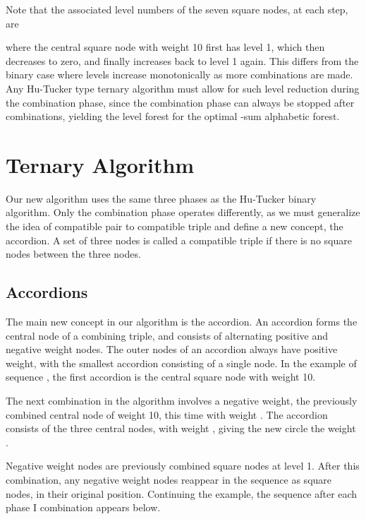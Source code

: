\documentclass[12pt]{article}
\begin{document}
Note that the associated level numbers of the seven square nodes, at each step,
are





\noindent where the central square node with weight 10 first has level 1, which then
decreases to zero, and finally increases back to level 1 again. This differs from the
binary case where levels increase monotonically as more combinations are made.
Any Hu-Tucker type ternary algorithm must allow for such level reduction during the
combination phase, since the combination phase can always be stopped after 
combinations, yielding the level forest for the optimal -sum alphabetic forest.


\section{Ternary Algorithm}

Our new algorithm uses the same three phases as the Hu-Tucker binary algorithm.
Only the combination phase operates differently, as we must generalize the idea
of compatible pair to compatible triple and define a new concept, the accordion. 
A set of three nodes is called a compatible triple if there is no square nodes
between the three nodes. 

\subsection{Accordions}

The main new concept in our algorithm is the accordion.  An accordion forms the
central node of a combining triple, and consists of alternating positive and
negative weight nodes. The outer nodes of an accordion always have positive 
weight, with the smallest accordion consisting of a single node. In the example
of sequence , the first accordion is the central square
node with weight 10. 

The next combination in the algorithm involves a negative weight, the previously
combined central node of weight 10, this time with weight .  The accordion
consists of the three central nodes, with weight , giving the
new circle the weight .

Negative weight nodes are previously combined square nodes at level 1.  After
this combination, any negative weight nodes reappear in the sequence as square
nodes, in their original position. Continuing the example, the sequence after 
each phase I combination appears below.
\end{document}
